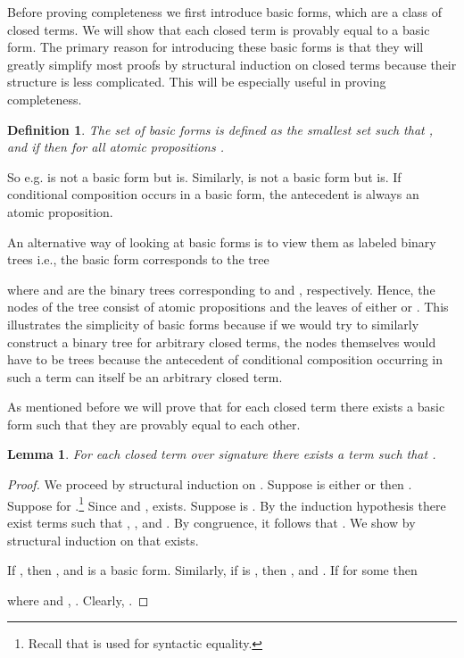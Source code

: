 \documentclass[a4paper,twoside,openright]{report}
\newtheorem{lem}[theorem]{Lemma}
\newtheorem{defn}[theorem]{Definition}
\begin{document}
Before proving completeness we first introduce basic forms, which are a class of closed terms. We will show that each closed term is provably equal to a basic form. The primary reason for introducing these basic forms is that they will greatly simplify most proofs by structural induction on closed terms because their structure is less complicated. This will be especially useful in proving completeness.

\begin{defn}\label{basic form def}
The set of basic forms  is defined as the smallest set
such that , and if  then  for all atomic propositions .
\end{defn}

So e.g.  is not a basic form but  is. Similarly,  is not a basic form but  is. If conditional composition occurs in a basic form, the antecedent is always an atomic proposition.

An alternative way of looking at basic forms is to view them as labeled binary trees i.e., the basic form  corresponds to the tree

where  and  are the binary trees corresponding to  and , respectively. Hence, the nodes of the tree consist of atomic propositions and the leaves of either  or . This illustrates the simplicity of basic forms because if we would try to similarly construct a binary tree for arbitrary closed terms, the nodes themselves would have to be trees because the antecedent of conditional composition occurring in such a term can itself be an arbitrary closed term.

As mentioned before we will prove that for each closed term there exists a basic form such that they are provably equal to each other.

\begin{lem}\label{basic form theorem}
For each closed term  over signature  there exists a
term  such that .
\end{lem}
\begin{proof}
We proceed by structural induction on . Suppose  is either  or  then . Suppose  for .\footnote{Recall that  is used for syntactic equality.} Since  and ,  exists. Suppose  is . By the induction hypothesis there exist terms  such that , , and . By congruence, it follows that . We show by structural induction on  that  exists.

If , then , and  is a basic form. Similarly, if  is , then , and . If  for some  then

where  and , . Clearly, .
\end{proof}
\end{document}
